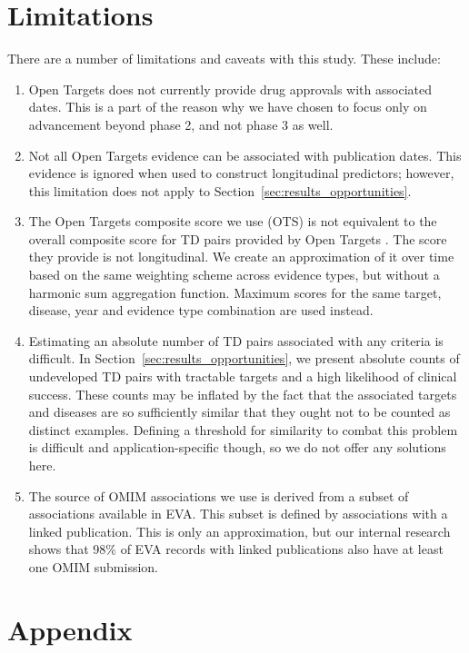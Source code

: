 \documentclass{article}
\begin{document}
\section{Limitations}

There are a number of limitations and caveats with this study. These include:

\begin{enumerate}[topsep=0pt,itemsep=-1ex,partopsep=1ex,parsep=1ex]
  \item Open Targets does not currently provide drug approvals with associated dates. This is a part of the reason why we have chosen to focus only on advancement beyond phase 2, and not phase 3 as well. 
  \item Not all Open Targets evidence can be associated with publication dates. This evidence is ignored when used to construct longitudinal predictors; however, this limitation does not apply to Section~\ref{sec:results_opportunities}.
  \item The Open Targets composite score we use (OTS) is not equivalent to the overall composite score for TD pairs provided by Open Targets \cite{OTscoring}. The score they provide is not longitudinal. We create an approximation of it over time based on the same weighting scheme across evidence types, but without a harmonic sum aggregation function. Maximum scores for the same target, disease, year and evidence type combination are used instead.
  \item Estimating an absolute number of TD pairs associated with any criteria is difficult. In Section~\ref{sec:results_opportunities}, we present absolute counts of undeveloped TD pairs with tractable targets and a high likelihood of clinical success. These counts may be inflated by the fact that the associated targets and diseases are so sufficiently similar that they ought not to be counted as distinct examples. Defining a threshold for similarity to combat this problem is difficult and application-specific though, so we do not offer any solutions here.
  \item The source of OMIM associations we use is derived from a subset of associations available in EVA. This subset is defined by associations with a linked publication. This is only an approximation, but our internal research shows that 98\% of EVA records with linked publications also have at least one OMIM submission.
\end{enumerate}

\pagebreak

\section{Appendix}
\end{document}
